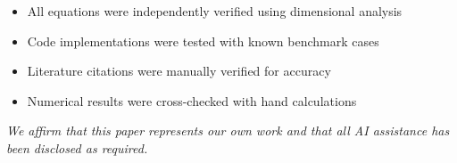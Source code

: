 \begin{itemize}
    \item All equations were independently verified using dimensional analysis
    \item Code implementations were tested with known benchmark cases
    \item Literature citations were manually verified for accuracy
    \item Numerical results were cross-checked with hand calculations
\end{itemize}

\vspace{1cm}
\noindent\textit{We affirm that this paper represents our own work and that all AI assistance has been disclosed as required.}
